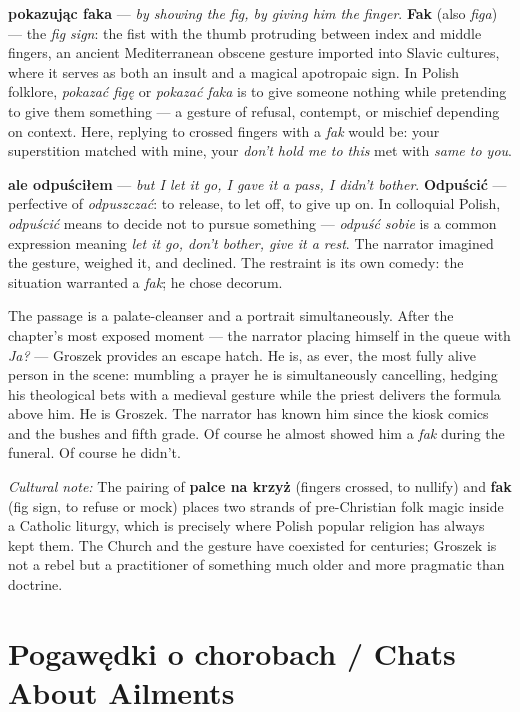\textbf{pokazując faka} --- \textit{by showing the
fig, by giving him the finger}. \textbf{Fak} (also
\textit{figa}) --- the \textit{fig sign}: the fist
with the thumb protruding between index and middle
fingers, an ancient Mediterranean obscene gesture
imported into Slavic cultures, where it serves as
both an insult and a magical apotropaic sign.
In Polish folklore, \textit{pokazać figę} or
\textit{pokazać faka} is to give someone nothing
while pretending to give them something --- a
gesture of refusal, contempt, or mischief depending
on context. Here, replying to crossed fingers
with a \textit{fak} would be: your superstition
matched with mine, your \textit{don't hold me to
this} met with \textit{same to you}.

\textbf{ale odpuściłem} --- \textit{but I let it go,
I gave it a pass, I didn't bother}.
\textbf{Odpuścić} --- perfective of \textit{odpuszczać}:
to release, to let off, to give up on. In colloquial
Polish, \textit{odpuścić} means to decide not to
pursue something --- \textit{odpuść sobie} is a
common expression meaning \textit{let it go, don't
bother, give it a rest}. The narrator imagined the
gesture, weighed it, and declined. The restraint
is its own comedy: the situation warranted a
\textit{fak}; he chose decorum.

\medskip
The passage is a palate-cleanser and a portrait
simultaneously. After the chapter's most exposed
moment --- the narrator placing himself in the queue
with \textit{Ja?} --- Groszek provides an escape
hatch. He is, as ever, the most fully alive person
in the scene: mumbling a prayer he is simultaneously
cancelling, hedging his theological bets with a
medieval gesture while the priest delivers the
formula above him. He is Groszek. The narrator
has known him since the kiosk comics and the bushes
and fifth grade. Of course he almost showed him
a \textit{fak} during the funeral. Of course he
didn't.

\medskip
\noindent\textit{Cultural note:} The pairing of
\textbf{palce na krzyż} (fingers crossed, to nullify)
and \textbf{fak} (fig sign, to refuse or mock) places
two strands of pre-Christian folk magic inside a
Catholic liturgy, which is precisely where Polish
popular religion has always kept them. The Church
and the gesture have coexisted for centuries; Groszek
is not a rebel but a practitioner of something much
older and more pragmatic than doctrine.

\section{Pogawędki o chorobach / Chats About Ailments}

